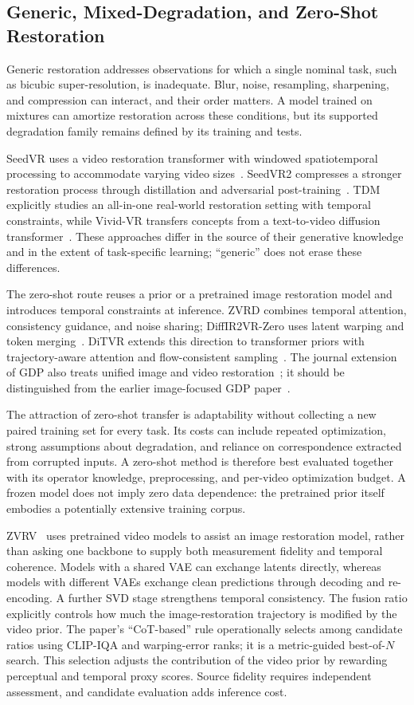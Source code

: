 \subsection{Generic, Mixed-Degradation, and Zero-Shot Restoration}
Generic restoration addresses observations for which a single nominal task, such as bicubic super-resolution, is inadequate. Blur, noise, resampling, sharpening, and compression can interact, and their order matters. A model trained on mixtures can amortize restoration across these conditions, but its supported degradation family remains defined by its training and tests.

SeedVR uses a video restoration transformer with windowed spatiotemporal processing to accommodate varying video sizes~\cite{seedvr}. SeedVR2 compresses a stronger restoration process through distillation and adversarial post-training~\cite{seedvr2}. TDM explicitly studies an all-in-one real-world restoration setting with temporal constraints, while Vivid-VR transfers concepts from a text-to-video diffusion transformer~\cite{tdm,vividvr}. These approaches differ in the source of their generative knowledge and in the extent of task-specific learning; ``generic'' does not erase these differences.

The zero-shot route reuses a prior or a pretrained image restoration model and introduces temporal constraints at inference. ZVRD combines temporal attention, consistency guidance, and noise sharing; DiffIR2VR-Zero uses latent warping and token merging~\cite{zvrd,diffir2vr}. DiTVR extends this direction to transformer priors with trajectory-aware attention and flow-consistent sampling~\cite{ditvr}. The journal extension of GDP also treats unified image and video restoration~\cite{gdp}; it should be distinguished from the earlier image-focused GDP paper~\cite{gdp_image}.

The attraction of zero-shot transfer is adaptability without collecting a new paired training set for every task. Its costs can include repeated optimization, strong assumptions about degradation, and reliance on correspondence extracted from corrupted inputs. A zero-shot method is therefore best evaluated together with its operator knowledge, preprocessing, and per-video optimization budget. A frozen model does not imply zero data dependence: the pretrained prior itself embodies a potentially extensive training corpus.

ZVRV~\cite{videodiffassist} uses pretrained video models to assist an image restoration model, rather than asking one backbone to supply both measurement fidelity and temporal coherence. Models with a shared VAE can exchange latents directly, whereas models with different VAEs exchange clean predictions through decoding and re-encoding. A further SVD stage strengthens temporal consistency. The fusion ratio explicitly controls how much the image-restoration trajectory is modified by the video prior. The paper's ``CoT-based'' rule operationally selects among candidate ratios using CLIP-IQA and warping-error ranks; it is a metric-guided best-of-$N$ search. This selection adjusts the contribution of the video prior by rewarding perceptual and temporal proxy scores. Source fidelity requires independent assessment, and candidate evaluation adds inference cost.

